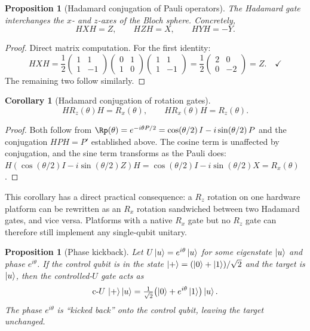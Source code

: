\documentclass[12pt, a4paper, oneside]{report}
\theoremstyle{plain}
\newtheorem{corollary}[theorem]{Corollary}
\newtheorem{proposition}[theorem]{Proposition}
\theoremstyle{definition}
\theoremstyle{remark}
\newcommand{\cU}{\mathrm{c}\text{-}U}
\newcommand{\Rx}{R_x}
\newcommand{\Rz}{R_z}
\begin{document}
\begin{proposition}[Hadamard conjugation of Pauli operators]
\label{prop:h-conj-pauli}
The Hadamard gate interchanges the $x$- and $z$-axes of the Bloch sphere. Concretely,
\[
  HXH = Z, \qquad HZH = X, \qquad HYH = -Y.
\]
\end{proposition}

\begin{proof}
Direct matrix computation. For the first identity:
\[
  HXH
  = \frac{1}{2}\begin{pmatrix}1&1\\1&-1\end{pmatrix}
    \begin{pmatrix}0&1\\1&0\end{pmatrix}
    \begin{pmatrix}1&1\\1&-1\end{pmatrix}
  = \frac{1}{2}\begin{pmatrix}2&0\\0&-2\end{pmatrix}
  = Z. \quad\checkmark
\]
The remaining two follow similarly.
\end{proof}

\begin{corollary}[Hadamard conjugation of rotation gates]
\label{cor:h-conj-rot}
\[
  H\Rz(\theta)H = \Rx(\theta), \qquad H\Rx(\theta)H = \Rz(\theta).
\]
\end{corollary}

\begin{proof}
Both follow from $\Rp(\theta) = e^{-i\theta P/2} = \cos(\theta/2)\,I - i\sin(\theta/2)\,P$
and the conjugation $HPH = P'$ established above. The cosine term is unaffected by conjugation,
and the sine term transforms as the Pauli does:
$H(\cos(\theta/2)I - i\sin(\theta/2)Z)H = \cos(\theta/2)I - i\sin(\theta/2)X = \Rx(\theta)$.
\end{proof}

This corollary has a direct practical consequence: a $\Rz$ rotation on one hardware
platform can be rewritten as an $\Rx$ rotation sandwiched between two Hadamard gates,
and vice versa. Platforms with a native $\Rx$ gate but no $\Rz$ gate can therefore still
implement any single-qubit unitary.

\begin{proposition}[Phase kickback]
\label{prop:phase-kickback}
Let $U\ket{u} = e^{i\theta}\ket{u}$ for some eigenstate $\ket{u}$ and phase $e^{i\theta}$.
If the control qubit is in the state $\ket{+} = (\ket{0}+\ket{1})/\sqrt{2}$ and the target
is $\ket{u}$, then the controlled-$U$ gate acts as
\[
  \cU\,\ket{+}\ket{u}
  = \tfrac{1}{\sqrt{2}}\bigl(\ket{0}+e^{i\theta}\ket{1}\bigr)\ket{u}.
\]
The phase $e^{i\theta}$ is ``kicked back'' onto the control qubit, leaving the target unchanged.
\end{proposition}
\end{document}

